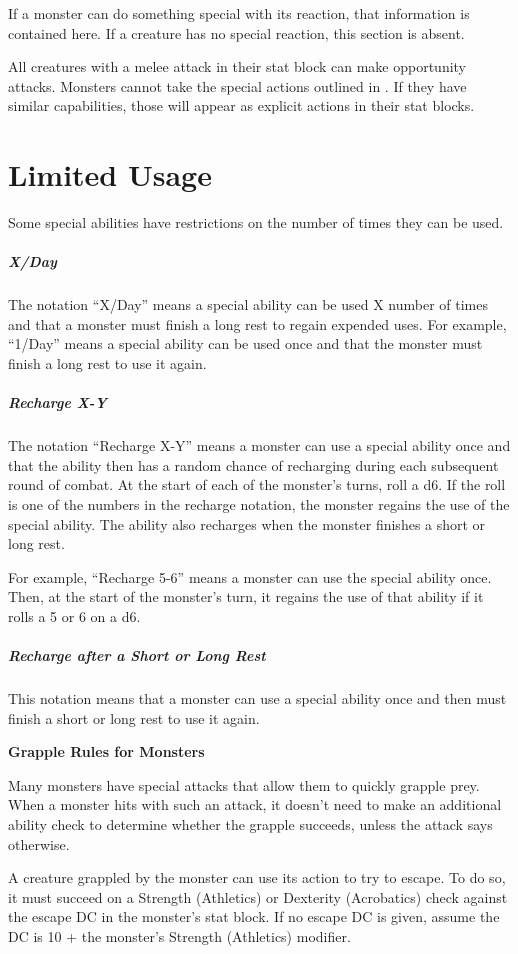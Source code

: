 If a monster can do something special with its reaction, that information is contained here. If a creature has no special reaction, this section is absent.

All creatures with a melee attack in their stat block can make opportunity attacks. Monsters cannot take the special actions outlined in . If they have similar capabilities, those will appear as explicit actions in their stat blocks. 

\section{Limited Usage}

Some special abilities have restrictions on the number of times they can be used.

\subparagraph*{X/Day} The notation “X/Day” means a special ability can be used X number of times and that a monster must finish a long rest to regain expended uses. For example, “1/Day” means a special ability can be used once and that the monster must finish a long rest to use it again.

\subparagraph*{Recharge X-Y} The notation “Recharge X-Y” means a monster can use a special ability once and that the ability then has a random chance of recharging during each subsequent round of combat. At the start of each of the monster's turns, roll a d6. If the roll is one of the numbers in the recharge notation, the monster regains the use of the special ability. The ability also recharges when the monster finishes a short or long rest.

For example, “Recharge 5-6” means a monster can use the special ability once. Then, at the start of the monster's turn, it regains the use of that ability if it rolls a 5 or 6 on a d6.

\subparagraph*{Recharge after a Short or Long Rest} This notation means that a monster can use a special ability once and then must finish a short or long rest to use it again.

\textbf*{Grapple Rules for Monsters}

Many monsters have special attacks that allow them to quickly grapple prey. When a monster hits with such an attack, it doesn't need to make an additional ability check to determine whether the grapple succeeds, unless the attack says otherwise.

A creature grappled by the monster can use its action to try to escape. To do so, it must succeed on a Strength (Athletics) or Dexterity (Acrobatics) check against the escape DC in the monster's stat block. If no escape DC is given, assume the DC is 10 + the monster's Strength (Athletics) modifier.

